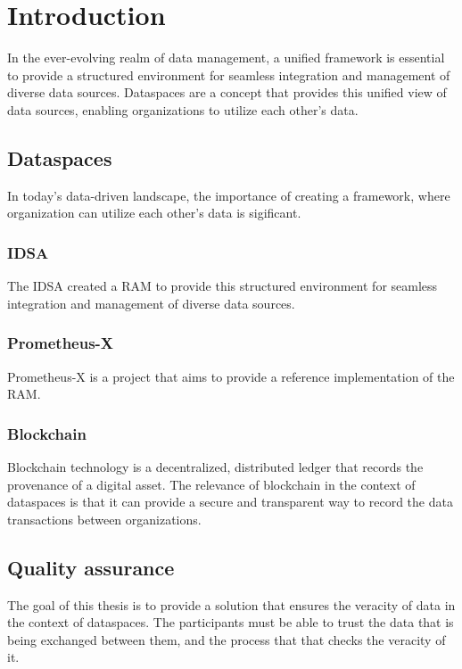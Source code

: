 \chapter{Introduction}

In the ever-evolving realm of data management, a unified framework is essential to provide a structured environment for seamless integration and management of diverse data sources. Dataspaces are a concept that provides this unified view of data sources, enabling organizations to utilize each other's data.

\section{Dataspaces}

In today's data-driven landscape, the importance of creating a framework, where organization can utilize each other's data is sigificant.

\subsection{IDSA}

The \ac{IDSA} created a \ac{RAM}\cite{ids-ram} to provide this structured environment for seamless integration and management of diverse data sources.

\subsection{Prometheus-X}

Prometheus-X is a project that aims to provide a reference implementation of the \ac{RAM}.

\subsection{Blockchain}

Blockchain technology is a decentralized, distributed ledger that records the provenance of a digital asset. The relevance of blockchain in the context of dataspaces is that it can provide a secure and transparent way to record the data transactions between organizations.

\section{Quality assurance}
 
The goal of this thesis is to provide a solution that ensures the veracity of data in the context of dataspaces. The participants must be able to trust the data that is being exchanged between them, and the process that that checks the veracity of it.

